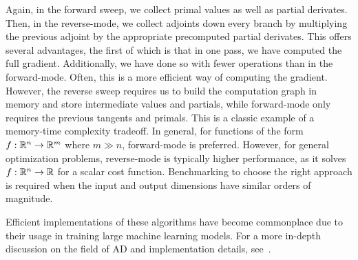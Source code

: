 Again, in the forward sweep, we collect primal values as well as partial derivates.
Then, in the reverse-mode, we collect adjoints down every branch by multiplying the previous adjoint by the appropriate precomputed  partial derivates.
This offers several advantages, the first of which is that in one pass, we have computed the full gradient.
Additionally, we have done so with fewer operations than in the forward-mode.
Often, this is a more efficient way of computing the gradient.
However, the reverse sweep requires us to build the computation graph in memory and store intermediate values and partials, while forward-mode only requires the previous tangents and primals.
This is a classic example of a memory-time complexity tradeoff.
In general, for functions of the form $f: \mathbb{R}^{n} \rightarrow \mathbb{R}^{m}$ where $m \gg n$, forward-mode is preferred.
However, for general optimization problems, reverse-mode is typically higher performance, as it solves $f: \mathbb{R}^{n} \rightarrow \mathbb{R}$ for a scalar cost function.
Benchmarking to choose the right approach is required when the input and output dimensions have similar orders of magnitude.

Efficient implementations of these algorithms have become commonplace due to their usage in training large machine learning models.
For a more in-depth discussion on the field of AD and implementation details, see~\cite{baydinAutomaticDifferentiationMachine2017}.